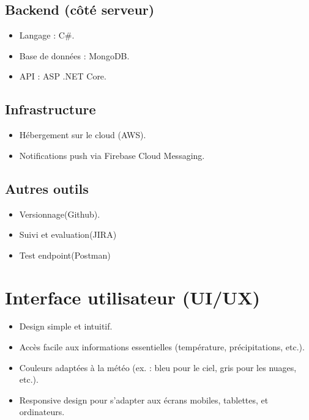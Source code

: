 \documentclass[a4paper,12pt]{article}
\begin{document}
\subsection{Backend (côté serveur)}
\begin{itemize}
    \item Langage : C\#.
    \item Base de données : MongoDB.
    \item API : ASP .NET Core.
\end{itemize}

\subsection{Infrastructure}
\begin{itemize}
    \item Hébergement sur le cloud (AWS).
    \item Notifications push via Firebase Cloud Messaging.
\end{itemize}
\subsection{Autres outils}
\begin{itemize}
  \item Versionnage(Github).
  \item Suivi et evaluation(JIRA)
\item Test endpoint(Postman)
\end{itemize}

\section{Interface utilisateur (UI/UX)}
\begin{itemize}
    \item Design simple et intuitif.
    \item Accès facile aux informations essentielles (température, précipitations, etc.).
    \item Couleurs adaptées à la météo (ex. : bleu pour le ciel, gris pour les nuages, etc.).
    \item Responsive design pour s'adapter aux écrans mobiles, tablettes, et ordinateurs.
\end{itemize}
\end{document}
